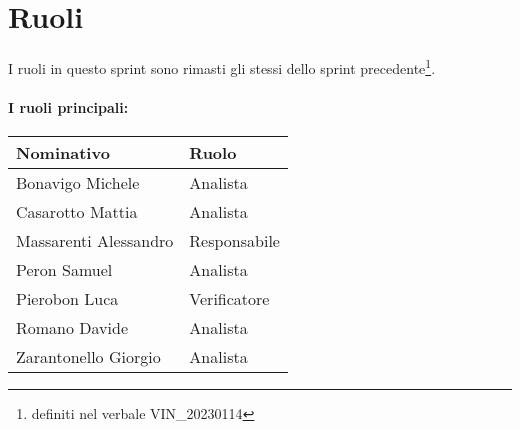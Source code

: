 \section{Ruoli}

I ruoli in questo sprint sono rimasti gli stessi dello sprint precedente\footnote{definiti nel verbale VIN\_20230114}.

\paragraph{I ruoli principali:}

\begin{center}
    \begin{tabularx}{\textwidth}{X l}
        
        \rowcolor{gray!30} \textbf{Nominativo} & \textbf{Ruolo}\\
        
        \hline

        Bonavigo Michele & Analista \\
        \rowcolor{gray!10}Casarotto Mattia & Analista \\
        Massarenti Alessandro & Responsabile \\
        \rowcolor{gray!10}Peron Samuel & Analista \\
        Pierobon Luca & Verificatore \\
        \rowcolor{gray!10}Romano Davide & Analista \\
        Zarantonello Giorgio & Analista \\

    \end{tabularx}
\end{center}
